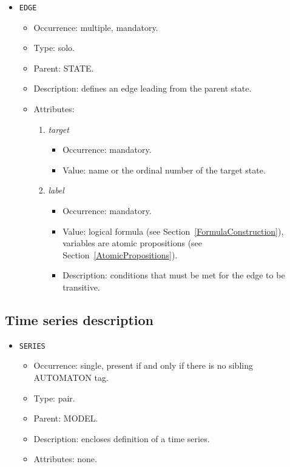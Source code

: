 \documentclass[12pt]{article}
\newenvironment{menum}{
\begin{enumerate}
  \setlength{\itemsep}{0pt}
  \setlength{\parskip}{0pt}
  \setlength{\parsep}{0pt}
}{\end{enumerate}}
\newenvironment{mitem}{
\begin{itemize}
  \setlength{\itemsep}{0pt}
  \setlength{\parskip}{0pt}
  \setlength{\parsep}{0pt}
}{\end{itemize}}
\begin{document}
\begin{mitem}
	\item \texttt{EDGE}
	\begin{mitem}
		\item Occurrence: multiple, mandatory.
		\item Type: solo.
		\item Parent: STATE.
		\item Description: defines an edge leading from the parent state.
		\item Attributes: 
		\begin{menum}
			\item \textit{target} 
			\begin{mitem}
				\item Occurrence: mandatory.
				\item Value: name or the ordinal number of the target state.
			\end{mitem}
			\item \textit{label} 
			\begin{mitem}
				\item Occurrence: mandatory.
				\item Value: logical formula (see Section~\ref{FormulaConstruction}), variables are atomic propositions (see Section~\ref{AtomicPropositions}).
				\item Description: conditions that must be met for the edge to be transitive.
			\end{mitem}
		\end{menum}
	\end{mitem}			
\end{mitem}		

\subsection{Time series description}
\begin{mitem}
	\item \texttt{SERIES}
	\begin{mitem}
		\item Occurrence: single,  present if and only if there is no sibling AUTOMATON tag.
		\item Type: pair.
		\item Parent: MODEL.
		\item Description: encloses definition of a time series.
		\item Attributes: none.
	\end{mitem}
\end{mitem}				
	
\end{document}

